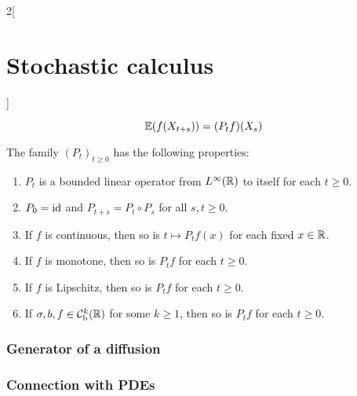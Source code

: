 \documentclass[../../../main_math.tex]{subfiles}
\begin{document}
\begin{multicols}{2}[\section{Stochastic calculus}]
\begin{corollary}
$$      \mathbb{E}(f(X_{t+s}))=(P_tf)(X_s)
    $$
  \end{corollary}
  \begin{proposition}
    The family ${(P_t)}_{t\geq 0}$ has the following properties:
    \begin{enumerate}
      \item $P_t$ is a bounded linear operator from $L^\infty(\mathbb{R})$ to itself for each $t\geq 0$.
      \item $P_0=\mathrm{id}$ and $P_{t+s}=P_t\circ P_s$ for all $s,t\geq 0$.
      \item If $f$ is continuous, then so is $t\mapsto P_tf(x)$ for each fixed $x\in\mathbb{R}$.
      \item If $f$ is monotone, then so is $P_tf$ for each $t\geq 0$.
      \item If $f$ is Lipschitz, then so is $P_tf$ for each $t\geq 0$.
      \item If $\sigma, b,f\in\mathcal{C}_\text{b}^k(\mathbb{R})$ for some $k\geq 1$, then so is $P_tf$ for each $t\geq 0$.
    \end{enumerate}
  \end{proposition}
  \subsubsection{Generator of a diffusion}
  \subsubsection{Connection with PDEs}
\end{multicols}
\end{document}
